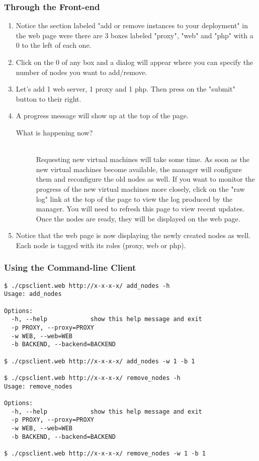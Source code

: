 \documentclass[12pt]{article}
\newenvironment{what}
{\begin{description} \item [What is happening now?] \hfill \\}
{\end{description}}
\newenvironment{framedbox}[1]%
{\begin{framed}
 \begingroup
 \fontsize{#1}{#1}\selectfont
}
{
 \endgroup
 \end{framed}
}
\begin{document}
\subsubsection{Through the Front-end}
\begin{enumerate}
\item Notice the section labeled "add or remove instances to your deployment" in
      the web page were there are 3 boxes labeled "proxy", "web" and "php" with
      a 0 to the left of each one.
\item Click on the 0 of any box and a dialog will appear where you can specify
the number of nodes you want to add/remove.
\item Let's add 1 web server, 1 proxy and 1 php. Then press on the "submit"
      button to their right.
\item A progress message will show up at the top of the page.
 \begin{what}
  Requesting new virtual machines will take some time. As soon as the new
  virtual machines become available, the manager will configure them and
  reconfigure the old nodes as well. If you want to monitor the progress of the
  new virtual machines more closely, click on the "raw log" link at the top of
  the page to view the log produced by the manager. You will need to refresh
  this page to view recent updates. Once the nodes are ready, they will be
  displayed on the web page.
 \end{what}
\item Notice that the web page is now displaying the newly created nodes as
      well. Each node is tagged with its roles (proxy, web or php).
\end{enumerate}

\subsubsection{Using the Command-line Client}
\begin{framedbox}{8pt}\begin{verbatim}
$ ./cpsclient.web http://x-x-x-x/ add_nodes -h
Usage: add_nodes

Options:
  -h, --help            show this help message and exit
  -p PROXY, --proxy=PROXY
  -w WEB, --web=WEB     
  -b BACKEND, --backend=BACKEND

$ ./cpsclient.web http://x-x-x-x/ add_nodes -w 1 -b 1

$ ./cpsclient.web http://x-x-x-x/ remove_nodes -h
Usage: remove_nodes

Options:
  -h, --help            show this help message and exit
  -p PROXY, --proxy=PROXY
  -w WEB, --web=WEB     
  -b BACKEND, --backend=BACKEND

$ ./cpsclient.web http://x-x-x-x/ remove_nodes -w 1 -b 1
\end{verbatim}\end{framedbox}
\end{document}
